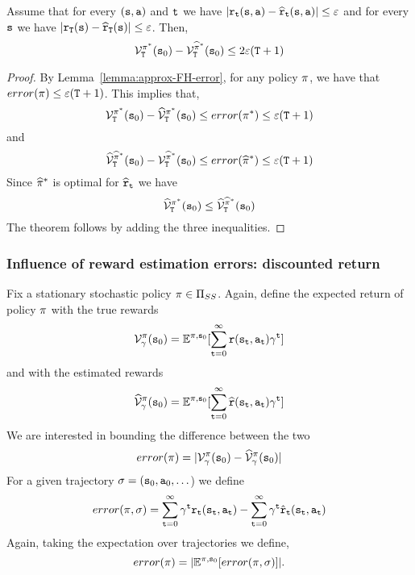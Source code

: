 \begin{theorem}
Assume that for every $({\tt s},{\tt a})$ and ${\tt t}$ we have
$|{\tt r}_{\tt t}({\tt s},{\tt a})-\widehat{{\tt r}}_{\tt t}({\tt s},{\tt a})|\leq
\varepsilon$ and for every ${\tt s}$ we have
$|{\tt r}_{\tt T}({\tt s})-\widehat{{\tt r}}_{\tt T}({\tt s})|\leq\varepsilon$.
Then,
\[
\mathcal{V}^{\pi^*}_{\tt T}({\tt s}_0) -
\mathcal{V}^{\widehat{\pi}^*}_{\tt T} ({\tt s}_0) \leq
2\varepsilon({\tt T}+1)
\]
\end{theorem}

\begin{proof}
By Lemma~\ref{lemma:approx-FH-error},  for any policy $\pi$, we
have that $error(\pi)\leq \varepsilon({\tt T}+1)$. This
implies that,
\[
\mathcal{V}^{\pi^*}_{\tt T}({\tt s}_0)-
\widehat{\mathcal{V}}^{\pi^*}_{\tt T}({\tt s}_0)\leq
error(\pi^*)\leq \varepsilon({\tt T}+1)
\]
and
\[
\widehat{\mathcal{V}}^{\widehat{\pi}^*}_{\tt T}({\tt s}_0)-
\mathcal{V}^{\widehat{\pi}^*}_{\tt T}({\tt s}_0)\leq
error(\widehat{\pi}^*)\leq \varepsilon({\tt T}+1)
\]
Since $\widehat{\pi}^*$ is optimal for
$\widehat{{\tt r}}_{\tt t}$ we have
\[
\widehat{\mathcal{V}}^{\pi^*}_{\tt T}({\tt s}_0)\leq
\widehat{\mathcal{V}}^{\widehat{\pi}^*}_{\tt T}({\tt s}_0)
\]
The theorem follows by adding the three inequalities.
\end{proof}


\subsubsection{Influence of reward estimation errors: discounted return}

Fix a stationary stochastic policy $\pi\in {\Pi _{SS}}$.
Again, define the expected return of policy $\pi$ with the true
rewards
\[
\mathcal{V}^\pi_\gamma({\tt s}_0)=\mathbb{E}^{\pi,{\tt s}_0}[\sum_{{\tt t}=0}^\infty
{\tt r}({\tt s}_{\tt t},{\tt a}_{\tt t})\gamma^{\tt t}]
\]
and with the estimated rewards
\[
\widehat{\mathcal{V}}^\pi_\gamma({\tt s}_0)=\mathbb{E}^{\pi,{\tt s}_0}[\sum_{{\tt t}=0}^\infty
\widehat{{\tt r}}({\tt s}_{\tt t},{\tt a}_{\tt t})\gamma^{\tt t} ]
\]
We are interested in bounding the difference between the two
\[
error(\pi)=|\mathcal{V}^\pi_\gamma({\tt s}_0)-\widehat{\mathcal{V}}^\pi_\gamma({\tt s}_0)|
\]
For a given trajectory
$\sigma=({\tt s}_0,{\tt a}_0,\ldots$)
we define
\[
error(\pi,\sigma)= \sum_{{\tt t}=0}^\infty \gamma^{\tt t}
{\tt r}_{\tt t}({\tt s}_{\tt t},{\tt a}_{\tt t})- \sum_{{\tt t}=0}^\infty
\gamma^{\tt t} \hat{{\tt r}}_{\tt t}({\tt s}_{\tt t},{\tt a}_{\tt t})
\]
Again, taking the expectation over trajectories we define,
\[
error(\pi)=|\mathbb{E}^{\pi,{\tt s}_0} [error(\pi,\sigma)]|.
\]

